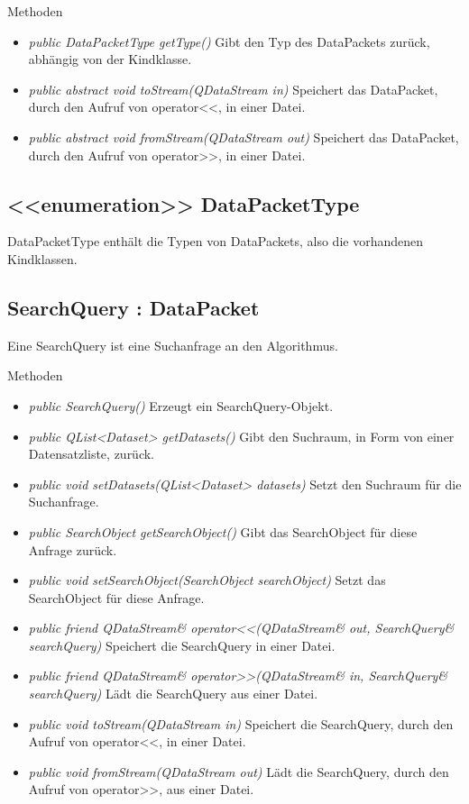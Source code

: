 Methoden
\begin{itemize}
\item \textit{public DataPacketType getType()} Gibt den Typ des DataPackets zurück, abhängig von der Kindklasse.
\item \textit{public abstract void toStream(QDataStream in)} Speichert das DataPacket, durch den Aufruf von operator<<, in einer Datei.
\item \textit{public abstract void fromStream(QDataStream out)} Speichert das DataPacket, durch den Aufruf von operator>>, in einer Datei.
\end{itemize}

\subsection*{<<enumeration>> DataPacketType}
DataPacketType enthält die Typen von DataPackets, also die vorhandenen Kindklassen.

\subsection*{SearchQuery : DataPacket}
Eine SearchQuery ist eine Suchanfrage an den Algorithmus.

Methoden
\begin{itemize}
\item \textit{public SearchQuery()} Erzeugt ein SearchQuery-Objekt.
\item \textit{public QList<Dataset> getDatasets()} Gibt den Suchraum, in Form von einer Datensatzliste, zurück.
\item \textit{public void setDatasets(QList<Dataset> datasets)} Setzt den Suchraum für die Suchanfrage.
\item \textit{public SearchObject getSearchObject()} Gibt das SearchObject für diese Anfrage zurück.
\item \textit{public void setSearchObject(SearchObject searchObject)} Setzt das SearchObject für diese Anfrage.
\item \textit{public friend QDataStream\& operator<<(QDataStream\& out, SearchQuery\& searchQuery)} Speichert die SearchQuery in einer Datei.
\item \textit{public friend QDataStream\& operator>>(QDataStream\& in, SearchQuery\& searchQuery)} Lädt die SearchQuery aus einer Datei.
\item \textit{public void toStream(QDataStream in)} Speichert die SearchQuery, durch den Aufruf von operator<<, in einer Datei.
\item \textit{public void fromStream(QDataStream out)} Lädt die SearchQuery, durch den Aufruf von operator>>, aus einer Datei.
\end{itemize}


